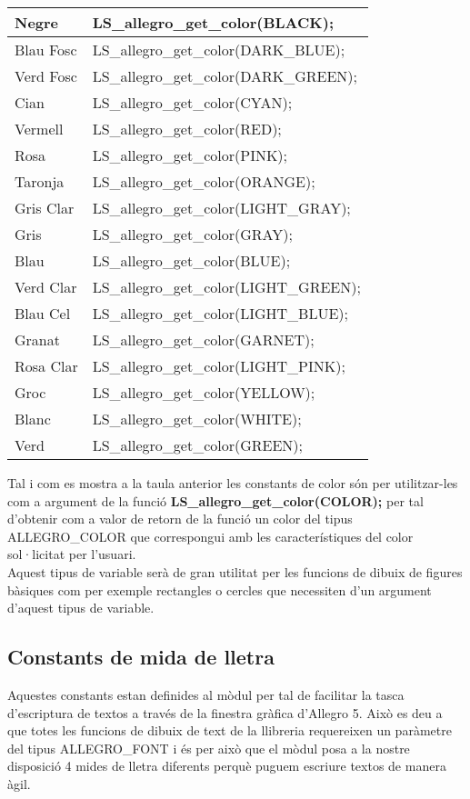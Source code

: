 \documentclass[11pt]{article}
\begin{document}
\begin{center}
\begin{tabular}{| l | l |}
\hline
Negre & LS\_allegro\_get\_color(BLACK); \\
\hline
Blau Fosc & LS\_allegro\_get\_color(DARK\_BLUE); \\
\hline
Verd Fosc & LS\_allegro\_get\_color(DARK\_GREEN); \\
\hline
Cian & LS\_allegro\_get\_color(CYAN); \\
\hline
Vermell & LS\_allegro\_get\_color(RED); \\
\hline
Rosa & LS\_allegro\_get\_color(PINK); \\
\hline
Taronja & LS\_allegro\_get\_color(ORANGE); \\
\hline
Gris Clar & LS\_allegro\_get\_color(LIGHT\_GRAY); \\
\hline
Gris & LS\_allegro\_get\_color(GRAY); \\
\hline
Blau & LS\_allegro\_get\_color(BLUE); \\
\hline
Verd Clar & LS\_allegro\_get\_color(LIGHT\_GREEN); \\
\hline
Blau Cel & LS\_allegro\_get\_color(LIGHT\_BLUE); \\
\hline
Granat & LS\_allegro\_get\_color(GARNET); \\
\hline
Rosa Clar & LS\_allegro\_get\_color(LIGHT\_PINK); \\
\hline
Groc & LS\_allegro\_get\_color(YELLOW); \\
\hline
Blanc & LS\_allegro\_get\_color(WHITE); \\
\hline
Verd & LS\_allegro\_get\_color(GREEN); \\
\hline  
\end{tabular}
\end{center}

\noindent Tal i com es mostra a la taula anterior les constants de color són per utilitzar-les com a argument de la funció \textbf{LS\_allegro\_get\_color(COLOR);} per tal d'obtenir com a valor de retorn de la funció un color del tipus ALLEGRO\_COLOR que correspongui amb les característiques del color sol·licitat per l'usuari.\\ Aquest tipus de variable serà de gran utilitat per les funcions de dibuix de figures bàsiques com per exemple rectangles o cercles que necessiten d'un argument d'aquest tipus de variable.

\subsection{Constants de mida de lletra}
Aquestes constants estan definides al mòdul per tal de facilitar la tasca d'escriptura de textos a través de la finestra gràfica d'Allegro 5. Això es deu a que totes les funcions de dibuix de text de la llibreria requereixen un paràmetre del tipus ALLEGRO\_FONT i és per això que el mòdul posa a la nostre disposició 4 mides de lletra diferents perquè puguem escriure textos de manera àgil.
\end{document}
